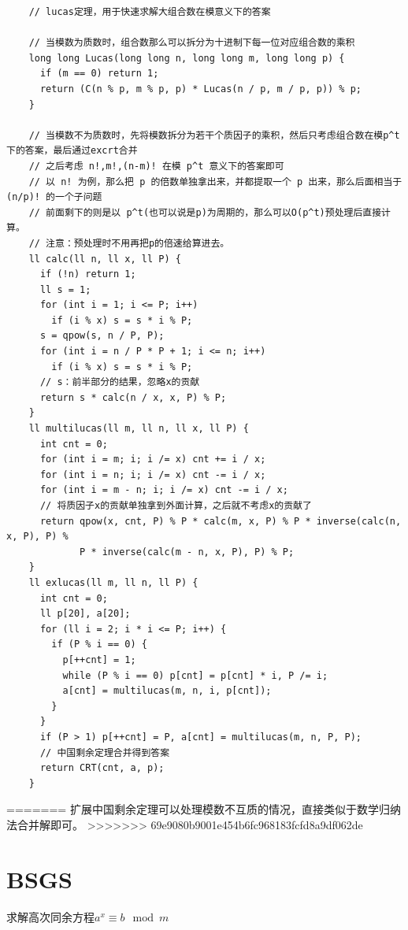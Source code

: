 \documentclass[a4paper,11pt,twoside,fontset = fandol,UTF8]{ctexbook} %
\begin{document}
	\begin{lstlisting}
	// lucas定理，用于快速求解大组合数在模意义下的答案
	
	// 当模数为质数时，组合数那么可以拆分为十进制下每一位对应组合数的乘积
	long long Lucas(long long n, long long m, long long p) {
	  if (m == 0) return 1;
	  return (C(n % p, m % p, p) * Lucas(n / p, m / p, p)) % p;
	}
	
	// 当模数不为质数时，先将模数拆分为若干个质因子的乘积，然后只考虑组合数在模p^t下的答案，最后通过excrt合并
	// 之后考虑 n!,m!,(n-m)! 在模 p^t 意义下的答案即可
	// 以 n! 为例，那么把 p 的倍数单独拿出来，并都提取一个 p 出来，那么后面相当于 (n/p)! 的一个子问题
	// 前面剩下的则是以 p^t(也可以说是p)为周期的，那么可以O(p^t)预处理后直接计算。
	// 注意：预处理时不用再把p的倍速给算进去。
	ll calc(ll n, ll x, ll P) {
	  if (!n) return 1;
	  ll s = 1;
	  for (int i = 1; i <= P; i++)
	    if (i % x) s = s * i % P;
	  s = qpow(s, n / P, P);
	  for (int i = n / P * P + 1; i <= n; i++)
	    if (i % x) s = s * i % P;
	  // s：前半部分的结果，忽略x的贡献
	  return s * calc(n / x, x, P) % P;
	}
	ll multilucas(ll m, ll n, ll x, ll P) {
	  int cnt = 0;
	  for (int i = m; i; i /= x) cnt += i / x;
	  for (int i = n; i; i /= x) cnt -= i / x;
	  for (int i = m - n; i; i /= x) cnt -= i / x;
	  // 将质因子x的贡献单独拿到外面计算，之后就不考虑x的贡献了
	  return qpow(x, cnt, P) % P * calc(m, x, P) % P * inverse(calc(n, x, P), P) %
	         P * inverse(calc(m - n, x, P), P) % P;
	}
	ll exlucas(ll m, ll n, ll P) {
	  int cnt = 0;
	  ll p[20], a[20];
	  for (ll i = 2; i * i <= P; i++) {
	    if (P % i == 0) {
	      p[++cnt] = 1;
	      while (P % i == 0) p[cnt] = p[cnt] * i, P /= i;
	      a[cnt] = multilucas(m, n, i, p[cnt]);
	    }
	  }
	  if (P > 1) p[++cnt] = P, a[cnt] = multilucas(m, n, P, P);
	  // 中国剩余定理合并得到答案
	  return CRT(cnt, a, p);
	}
	\end{lstlisting}
=======
	扩展中国剩余定理可以处理模数不互质的情况，直接类似于数学归纳法合并解即可。
>>>>>>> 69e9080b9001e454b6fc968183fcfd8a9df062de
	
	\section{BSGS}
	求解高次同余方程$a^x\equiv b\mod m$
	
\end{document}
